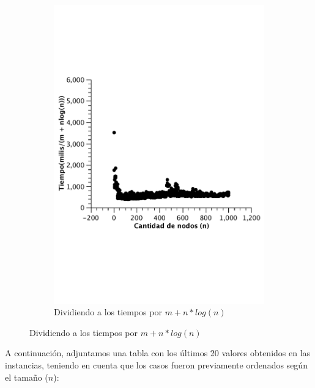 \begin{figure}[H]
        \begin{subfigure}[b]{0.5\textwidth}
                \includegraphics[width=\textwidth]{imagenes/completo-listas-4.pdf}
                \caption{Dividiendo a los tiempos por $m + n*log(n)$}
        \end{subfigure}
\end{figure}
A continuación, adjuntamos una tabla con los últimos 20 valores obtenidos en las instancias, teniendo en cuenta que los casos fueron previamente ordenados según el tamaño ($n$):

